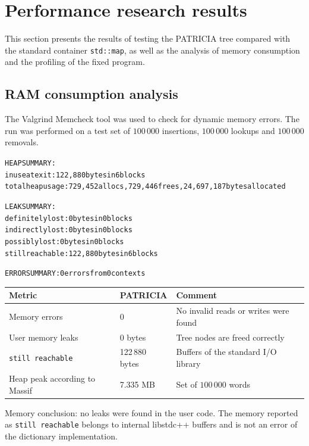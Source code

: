 \section{Performance research results}

This section presents the results of testing the PATRICIA tree compared with the standard
container \texttt{std::map}, as well as the analysis of memory consumption and the profiling of
the fixed program.

\subsection{RAM consumption analysis}

The Valgrind Memcheck tool was used to check for dynamic memory errors. The run was performed on a
test set of $100\,000$ insertions, $100\,000$ lookups and $100\,000$ removals.

{\footnotesize
\begin{alltt}
HEAP SUMMARY:
    in use at exit: 122,880 bytes in 6 blocks
    total heap usage: 729,452 allocs, 729,446 frees, 24,697,187 bytes allocated

LEAK SUMMARY:
    definitely lost: 0 bytes in 0 blocks
    indirectly lost: 0 bytes in 0 blocks
    possibly lost: 0 bytes in 0 blocks
    still reachable: 122,880 bytes in 6 blocks

ERROR SUMMARY: 0 errors from 0 contexts
\end{alltt}
}

\begin{table}[!ht]
\centering
\begin{tabular}{|P{5.5cm}|P{4cm}|P{4cm}|}
\hline
{}
Metric & PATRICIA & Comment \\
\hline
Memory errors & 0 & No invalid reads or writes were found \\
\hline
User memory leaks & 0 bytes & Tree nodes are freed correctly \\
\hline
\texttt{still reachable} & 122\,880 bytes & Buffers of the standard I/O library \\
\hline
Heap peak according to Massif & 7.335 MB & Set of $100\,000$ words \\
\hline
\end{tabular}
\end{table}

Memory conclusion: no leaks were found in the user code. The memory reported as
\texttt{still reachable} belongs to internal libstdc++ buffers and is not an error of the
dictionary implementation.

